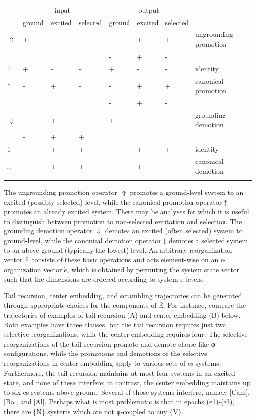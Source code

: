 \begin{tabularx}{\textwidth}{XXXXXXXX} & \multicolumn{3}{c}{ input} & \multicolumn{3}{c}{ output} & \\
\lsptoprule
& ground & excited & selected & ground & excited & selected & \\
 $\Uparrow $ & + & {}- & {}- & {}- & + & + & ungrounding promotion\\
&  &  &  & {}- & + & {}- & \\
 1 & + & {}- & {}- & + & {}- & {}- & identity\\
 ↑ & {}- & + & {}- & {}- & + & + & canonical promotion\\
&  &  &  & {}- & + & {}- & \\
 $\Downarrow $ & {}- & + & {}- & + & {}- & {}- & grounding demotion\\
& {}- & + & + &  &  &  & \\
 1 & {}- & + & + & {}- & + & + & identity\\
 ↓ & {}- & + & + & {}- & + & {}- & canonical demotion\\
\lspbottomrule
\end{tabularx}
  The ungrounding promotion operator $\Uparrow $ promotes a ground-level system to an excited (possibly selected) level, while the canonical promotion operator ↑ promotes an already excited system. There may be analyses for which it is useful to distinguish between promotion to non-selected excitation and selection. The grounding demotion operator $\Downarrow $ demotes an excited (often selected) system to ground-level, while the  canonical demotion operator ↓ demotes a selected system to an above-ground (typically the lowest) level. An arbitrary reorganization vector Ê consists of these basic operations and acts element-wise on an e-organization vector  $\widetilde{{e}}$, which is obtained by permuting the system state vector such that the dimensions are ordered according to system e-levels.

  Tail recursion, center embedding, and scrambling trajectories can be generated through appropriate choices for the components of Ê. For instance, compare the trajectories of examples of tail recursion (A) and center embedding (B) below. Both examples have three clauses, but the tail recursion requires just two selective reorganizations, while the center embedding requires four. The selective reorganizations of the tail recursion promote and demote clause-like φ configurations, while the promotions and demotions of the selective reorganizations in center embedding apply to various sets of cs-systems. Furthermore, the tail recursion maintains at most four systems in an excited state, and none of these interfere; in contrast, the center embedding maintains up to six cs-systems above ground. Several of those systems interfere, namely [Cam], [Bo], and [Al]. Perhaps what is most problematic is that in epochs (e1)-(e3), there are \{N\} systems which are not φ-coupled to any \{V\}.


